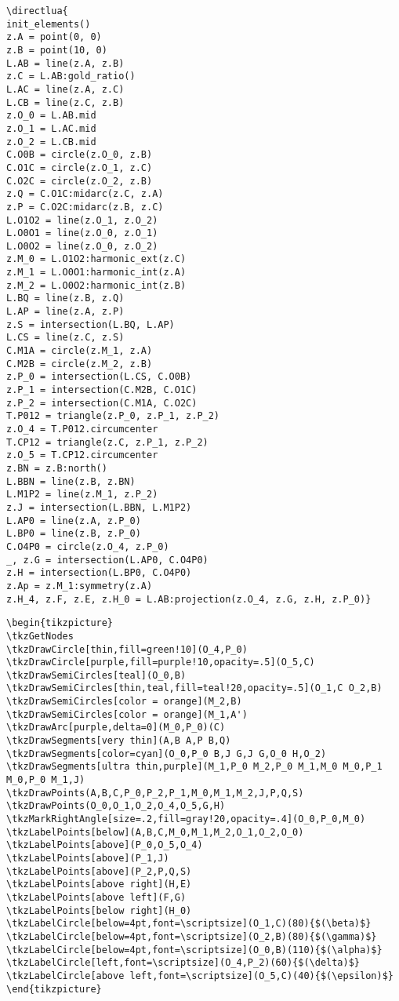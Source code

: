 \begin{verbatim}
\directlua{
init_elements()
z.A = point(0, 0)
z.B = point(10, 0)
L.AB = line(z.A, z.B)
z.C = L.AB:gold_ratio()
L.AC = line(z.A, z.C)
L.CB = line(z.C, z.B)
z.O_0 = L.AB.mid
z.O_1 = L.AC.mid
z.O_2 = L.CB.mid
C.O0B = circle(z.O_0, z.B)
C.O1C = circle(z.O_1, z.C)
C.O2C = circle(z.O_2, z.B)
z.Q = C.O1C:midarc(z.C, z.A)
z.P = C.O2C:midarc(z.B, z.C)
L.O1O2 = line(z.O_1, z.O_2)
L.O0O1 = line(z.O_0, z.O_1)
L.O0O2 = line(z.O_0, z.O_2)
z.M_0 = L.O1O2:harmonic_ext(z.C)
z.M_1 = L.O0O1:harmonic_int(z.A)
z.M_2 = L.O0O2:harmonic_int(z.B)
L.BQ = line(z.B, z.Q)
L.AP = line(z.A, z.P)
z.S = intersection(L.BQ, L.AP)
L.CS = line(z.C, z.S)
C.M1A = circle(z.M_1, z.A)
C.M2B = circle(z.M_2, z.B)
z.P_0 = intersection(L.CS, C.O0B)
z.P_1 = intersection(C.M2B, C.O1C)
z.P_2 = intersection(C.M1A, C.O2C)
T.P012 = triangle(z.P_0, z.P_1, z.P_2)
z.O_4 = T.P012.circumcenter
T.CP12 = triangle(z.C, z.P_1, z.P_2)
z.O_5 = T.CP12.circumcenter
z.BN = z.B:north()
L.BBN = line(z.B, z.BN)
L.M1P2 = line(z.M_1, z.P_2)
z.J = intersection(L.BBN, L.M1P2)
L.AP0 = line(z.A, z.P_0)
L.BP0 = line(z.B, z.P_0)
C.O4P0 = circle(z.O_4, z.P_0)
_, z.G = intersection(L.AP0, C.O4P0)
z.H = intersection(L.BP0, C.O4P0)
z.Ap = z.M_1:symmetry(z.A)
z.H_4, z.F, z.E, z.H_0 = L.AB:projection(z.O_4, z.G, z.H, z.P_0)}
\end{verbatim}

\begin{verbatim}
\begin{tikzpicture}
\tkzGetNodes
\tkzDrawCircle[thin,fill=green!10](O_4,P_0)
\tkzDrawCircle[purple,fill=purple!10,opacity=.5](O_5,C)
\tkzDrawSemiCircles[teal](O_0,B)
\tkzDrawSemiCircles[thin,teal,fill=teal!20,opacity=.5](O_1,C O_2,B)
\tkzDrawSemiCircles[color = orange](M_2,B)
\tkzDrawSemiCircles[color = orange](M_1,A')
\tkzDrawArc[purple,delta=0](M_0,P_0)(C)
\tkzDrawSegments[very thin](A,B A,P B,Q)
\tkzDrawSegments[color=cyan](O_0,P_0 B,J G,J G,O_0 H,O_2)
\tkzDrawSegments[ultra thin,purple](M_1,P_0 M_2,P_0 M_1,M_0 M_0,P_1 M_0,P_0 M_1,J)
\tkzDrawPoints(A,B,C,P_0,P_2,P_1,M_0,M_1,M_2,J,P,Q,S)
\tkzDrawPoints(O_0,O_1,O_2,O_4,O_5,G,H)
\tkzMarkRightAngle[size=.2,fill=gray!20,opacity=.4](O_0,P_0,M_0)
\tkzLabelPoints[below](A,B,C,M_0,M_1,M_2,O_1,O_2,O_0)
\tkzLabelPoints[above](P_0,O_5,O_4)
\tkzLabelPoints[above](P_1,J)
\tkzLabelPoints[above](P_2,P,Q,S)
\tkzLabelPoints[above right](H,E)
\tkzLabelPoints[above left](F,G)
\tkzLabelPoints[below right](H_0)
\tkzLabelCircle[below=4pt,font=\scriptsize](O_1,C)(80){$(\beta)$}
\tkzLabelCircle[below=4pt,font=\scriptsize](O_2,B)(80){$(\gamma)$}
\tkzLabelCircle[below=4pt,font=\scriptsize](O_0,B)(110){$(\alpha)$}
\tkzLabelCircle[left,font=\scriptsize](O_4,P_2)(60){$(\delta)$}
\tkzLabelCircle[above left,font=\scriptsize](O_5,C)(40){$(\epsilon)$}
\end{tikzpicture}
\end{verbatim}

